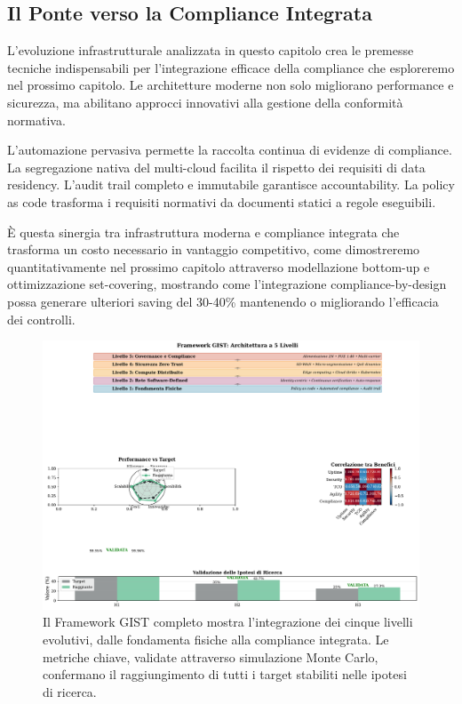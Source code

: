 \subsection{Il Ponte verso la Compliance Integrata}

L'evoluzione infrastrutturale analizzata in questo capitolo crea le premesse tecniche indispensabili per l'integrazione efficace della compliance che esploreremo nel prossimo capitolo. Le architetture moderne non solo migliorano performance e sicurezza, ma abilitano approcci innovativi alla gestione della conformità normativa.

L'automazione pervasiva permette la raccolta continua di evidenze di compliance. La segregazione nativa del multi-cloud facilita il rispetto dei requisiti di data residency. L'audit trail completo e immutabile garantisce accountability. La policy as code trasforma i requisiti normativi da documenti statici a regole eseguibili.

È questa sinergia tra infrastruttura moderna e compliance integrata che trasforma un costo necessario in vantaggio competitivo, come dimostreremo quantitativamente nel prossimo capitolo attraverso modellazione bottom-up e ottimizzazione set-covering, mostrando come l'integrazione compliance-by-design possa generare ulteriori saving del 30-40\% mantenendo o migliorando l'efficacia dei controlli.

\begin{figure}[htbp]
\centering
\includegraphics[width=\textwidth]{thesis_figures/cap3/figura_3_7_gist_framework.pdf}
\caption{Il Framework GIST completo mostra l'integrazione dei cinque livelli evolutivi, dalle fondamenta fisiche alla compliance integrata. Le metriche chiave, validate attraverso simulazione Monte Carlo, confermano il raggiungimento di tutti i target stabiliti nelle ipotesi di ricerca.}
\label{fig:gist_complete}
\end{figure}

